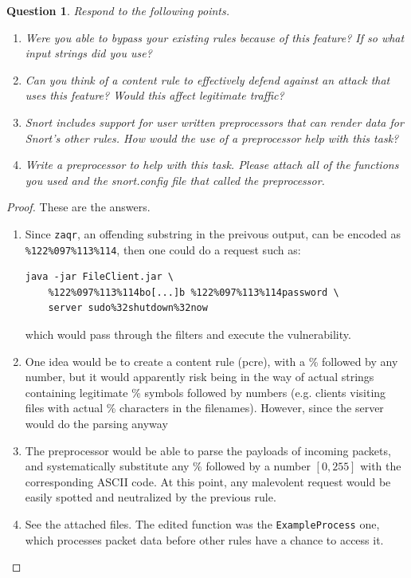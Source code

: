 \documentclass[a4paper,11pt,hidelinks]{article}
\newtheorem{theorem}{Question}[subsection]
\begin{document}
\begin{theorem}
    Respond to the following points.
    \begin{enumerate}
        \item Were you able to bypass your existing rules because of this feature? If so what input strings did you use?
        \item Can you think of a content rule to effectively defend against an attack that uses this feature? Would this affect legitimate traffic?
        \item Snort includes support for user written preprocessors that can render data for Snort's other rules. How would the use of a preprocessor help with this task?
        \item Write a preprocessor to help with this task. Please attach all of the functions you used and the snort.config file that called the preprocessor.
    \end{enumerate}
\end{theorem}

\begin{proof}
    These are the answers.
    \begin{enumerate}
        \item Since \verb=zaqr=, an offending substring in the preivous output, can be encoded as \verb=%122%097%113%114=, then one could do a request such as:
        \begin{verbatim}
java -jar FileClient.jar \
    %122%097%113%114bo[...]b %122%097%113%114password \
    server sudo%32shutdown%32now
        \end{verbatim}
        which would pass through the filters and execute the vulnerability.
    
        \item One idea would be to create a content rule (pcre), with a \% followed by any number, but it would apparently risk being in the way of actual strings containing legitimate \% symbols followed by numbers (e.g. clients visiting files with actual \% characters in the filenames). However, since the server would do the parsing anyway
        \item The preprocessor would be able to parse the payloads of incoming packets, and systematically substitute any \% followed by a number $[0, 255]$ with the corresponding ASCII code. At this point, any malevolent request would be easily spotted and neutralized by the previous rule.
        \item See the attached files. The edited function was the \verb=ExampleProcess= one, which processes packet data before other rules have a chance to access it. 
    \end{enumerate}
\end{proof}

\endgroup
\end{document}
